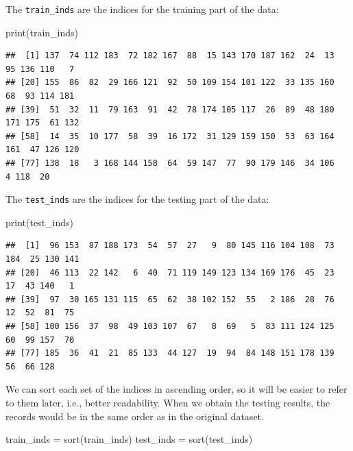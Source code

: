 \documentclass[
]{article}
\newenvironment{Shaded}{\begin{snugshade}}{\end{snugshade}}
\newcommand{\FunctionTok}[1]{\textcolor[rgb]{0.00,0.00,0.00}{#1}}
\newcommand{\NormalTok}[1]{#1}
\newcommand{\OtherTok}[1]{\textcolor[rgb]{0.56,0.35,0.01}{#1}}
\begin{document}
The \texttt{train\_inds} are the indices for the training part of the
data:

\begin{Shaded}
\begin{Highlighting}[]
\FunctionTok{print}\NormalTok{(train\_inds)}
\end{Highlighting}
\end{Shaded}

\begin{verbatim}
##  [1] 137  74 112 183  72 182 167  88  15 143 170 187 162  24  13  95 136 110   7
## [20] 155  86  82  29 166 121  92  50 109 154 101 122  33 135 160  68  93 114 181
## [39]  51  32  11  79 163  91  42  78 174 105 117  26  89  48 180 171 175  61 132
## [58]  14  35  10 177  58  39  16 172  31 129 159 150  53  63 164 161  47 126 120
## [77] 138  18   3 168 144 158  64  59 147  77  90 179 146  34 106   4 118  20
\end{verbatim}

The \texttt{test\_inds} are the indices for the testing part of the
data:

\begin{Shaded}
\begin{Highlighting}[]
\FunctionTok{print}\NormalTok{(test\_inds)}
\end{Highlighting}
\end{Shaded}

\begin{verbatim}
##  [1]  96 153  87 188 173  54  57  27   9  80 145 116 104 108  73 184  25 130 141
## [20]  46 113  22 142   6  40  71 119 149 123 134 169 176  45  23  17  43 140   1
## [39]  97  30 165 131 115  65  62  38 102 152  55   2 186  28  76  12  52  81  75
## [58] 100 156  37  98  49 103 107  67   8  69   5  83 111 124 125  60  99 157  70
## [77] 185  36  41  21  85 133  44 127  19  94  84 148 151 178 139  56  66 128
\end{verbatim}

We can sort each set of the indices in ascending order, so it will be
easier to refer to them later, i.e., better readability. When we obtain
the testing results, the records would be in the same order as in the
original dataset.

\begin{Shaded}
\begin{Highlighting}[]
\NormalTok{train\_inds }\OtherTok{=} \FunctionTok{sort}\NormalTok{(train\_inds)}
\NormalTok{test\_inds }\OtherTok{=} \FunctionTok{sort}\NormalTok{(test\_inds)}
\end{Highlighting}
\end{Shaded}
\end{document}
